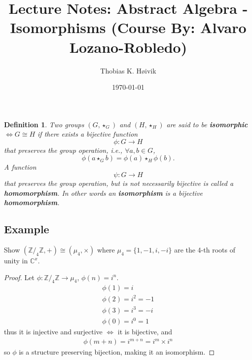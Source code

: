 \documentclass[12pt]{article}
\title{Lecture Notes: Abstract Algebra - Isomorphisms (Course By: Alvaro Lozano-Robledo)}
\author{Thobias K. Høivik}
\date{\today}
\newtheorem{definition}{Definition}
\begin{document}
\maketitle

\begin{definition} 
    Two groups \((G,\star_G)\) and \((H, \star_H)\) are said to be 
    \textbf{isomorphic} \(\Leftrightarrow G \cong H\) 
    if there exists a bijective function 
    \[
        \phi: G \to H
    \]
    that preserves the group operation, i.e., \(\forall a, b \in G \),
    \[ 
        \phi (a \star_G b) = \phi (a) \star_H \phi (b).
    \]
    A function 
    \[
        \psi: G \to H
    \]
    that preserves the group operation,
    but is not necessarily bijective is called a \textbf{homomorphism}.
    In other words an \textbf{isomorphism} is a bijective \textbf{homomorphism}.
\end{definition}

\subsection*{Example} 
Show \((\mathbb Z/_4 \mathbb Z, +) \cong (\mu_4, \times) \) 
where \(\mu_4 = \{1, -1, i, -i\}\) 
are the 4-th roots of unity in \(\mathbb C^x\). 
\begin{proof}
    Let \(\phi : \mathbb Z/_4 \mathbb Z \rightarrow \mu_4\), 
    \(\phi (n) = i^n\). 
    \begin{gather*}
        \phi(1) = i         \\
        \phi(2) = i^2 = -1  \\
        \phi(3) = i^3 = -i  \\
        \phi(0) = i ^ 0 = 1 
    \end{gather*}
    thus it is injective and surjective \(\Leftrightarrow\) it is bijective, 
    and 
    \begin{gather*}
        \phi (m+n) = i^{m+n} = i^m \times i^n 
    \end{gather*}
    so \(\phi\) is a structure preserving bijection, making it an isomorphism. 
\end{proof}
\end{document}
